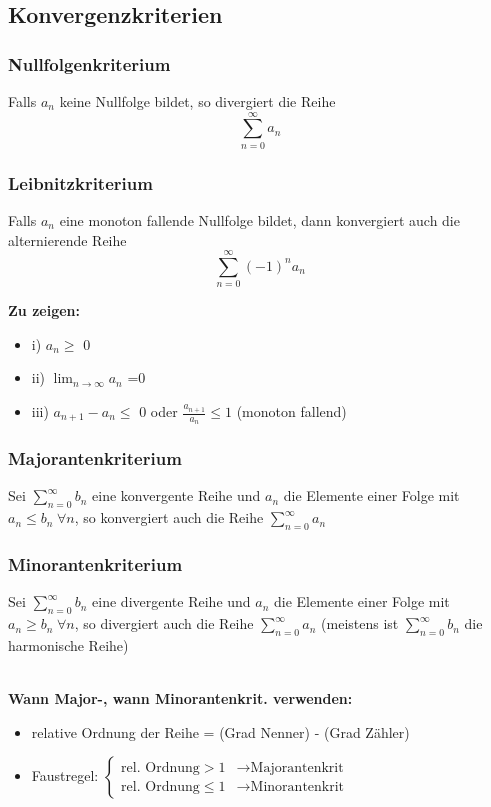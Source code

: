 \documentclass[8pt, a4paper, landscape, fleqn]{scrartcl}
\newenvironment {annotation}[1]
				{\begin{itshape} \begin{small} \textbf{#1} \begin{itemize}}
				{\end{itemize} \end{small} \end{itshape}}
\begin{document}
\begin{multicols*}{3}
			\subsection{Konvergenzkriterien}
				\subsubsection{Nullfolgenkriterium}
					Falls $a_n$ keine Nullfolge bildet, so divergiert die Reihe \[\sum_{n=0}^{\infty}a_n\]
				\subsubsection{Leibnitzkriterium}
					Falls $a_n$ eine monoton fallende Nullfolge bildet, dann konvergiert auch die alternierende Reihe \[\sum_{n=0}^{\infty} (-1)^n a_n\]
					\begin{annotation}{Zu zeigen:}
						\item[i)] $a_n \ge$ 0
						\item[ii)] $\lim_{n\rightarrow \infty} a_n$ =0
						\item[iii)] $a_{n+1} - a_n \le$ 0 oder $\frac{a_{n+1}}{a_n} \le 1$ (monoton fallend)
					\end{annotation}
					
					
				\subsubsection{Majorantenkriterium}
					Sei $\sum_{n=0}^{\infty}b_n$ eine konvergente Reihe und $a_n$ die Elemente einer Folge mit $a_n \le b_n \hspace{3pt} \forall n$, so konvergiert auch die Reihe $\sum_{n=0}^{\infty} a_n$
				\subsubsection{Minorantenkriterium}
					Sei $\sum_{n=0}^{\infty}b_n$ eine divergente Reihe und $a_n$ die Elemente einer Folge mit $a_n \ge b_n \hspace{3pt} \forall n$, so divergiert auch die Reihe $\sum_{n=0}^{\infty} a_n$ (meistens ist $\sum_{n=0}^{\infty}b_n$ die harmonische Reihe)\\\\
				    \begin{annotation}{Wann Major-, wann Minorantenkrit. verwenden:}
				        \item relative Ordnung der Reihe = (Grad Nenner) - (Grad Zähler)\\
				        \item Faustregel:
				        $\begin{cases}
				            \text{rel. Ordnung}>1 &\rightarrow \text{Majorantenkrit}\\
				            \text{rel. Ordnung}\leq1 &\rightarrow \text{Minorantenkrit}
				        \end{cases}$
				    \end{annotation}

\end{multicols*}
\end{document}
